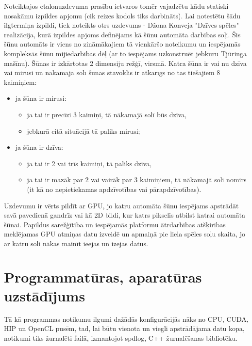 Noteiktajos etalonuzdevuma prasību ietvaros tomēr vajadzētu kādu statiski
nosakāmu izpildes apjomu (cik reizes kodols tiks darbināts). Lai notestētu šādu
ilgtermiņa izpildi, tiek noteikts otrs uzdevums - Džona Konveja "Dzīves spēles"
\cite{conway1970conway} realizācija, kurā izpildes apjoms definējams kā šūnu
automāta darbības soļi. Šis šūnu automāts ir viens no zināmākajiem tā vienkāršo noteikumu un iespējamās
kompleksās šūnu mijiedarbības dēļ (ar to iespējams uzkonstruēt jebkuru Tjūringa
mašīnu).\cite{conway1970conway} Šūnas ir izkārtotas 2 dimensiju režģī, virsmā. Katra šūna ir vai nu
dzīva vai mirusi un nākamajā solī šūnas stāvoklis ir atkarīgs no tās tiešajiem
8 kaimiņiem:
\begin{itemize}
    \item ja šūna ir mirusi:
        \begin{itemize}
            \item ja tai ir precīzi 3 kaimiņi, tā nākamajā solī būs dzīva,
            \item jebkurā citā situācijā tā paliks mirusi;
        \end{itemize}
    \item ja šūna ir dzīva:
        \begin{itemize}
            \item ja tai ir 2 vai trīs kaimiņi, tā paliks dzīva,
            \item ja tai ir mazāk par 2 vai vairāk par 3 kaimiņiem,
                tā nākamajā solī nomirs (it kā no nepietiekamas
                apdzīvotības vai pārapdzīvotības).
        \end{itemize}
\end{itemize}

Uzdevumu ir vērts pildīt ar GPU, jo katru automāta šūnu iespējams apstrādāt
savā pavedienā gandrīz vai kā 2D bildi, kur katrs pikselis atbilst katrai
automāta šūnai. Papildus sarežģītība un iespējamās platformu ātrdarbības
atšķirības meklējamas GPU atmiņas datu izveidē un apmaiņā pie liela spēles soļu
skaita, jo ar katru soli nākas mainīt ieejas un izejas datus.


\section{Programmatūras, aparatūras uzstādījums}
Tā kā programmas notikumu ilgumi dažādās konfigurācijās nāks no CPU, CUDA, HIP
un OpenCL pusēm, tad, lai būtu vienota un viegli apstrādājama datu kopa,
notikumi tiks žurnalēti failā, izmantojot spdlog\cite{spdlog-github}, C++
žurnalēšanas bibliotēku.

